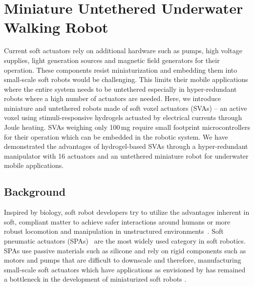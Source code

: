 \graphicspath{{Images/untetheredWalker/}}

\chapter{Miniature Untethered Underwater Walking Robot}
\label{chap:untetheredWalker}
Current soft actuators rely on additional hardware such as pumps, high voltage supplies, light generation sources and magnetic field generators for their operation. 
These components resist miniaturization and embedding them into small-scale soft robots would be challenging. This limits their mobile applications where the entire system needs to be untethered especially in hyper-redundant robots where a high number of actuators are needed. Here, we introduce miniature and untethered robots made of soft voxel actuators (SVAs) -- an active voxel using stimuli-responsive hydrogels actuated by electrical currents through Joule heating. SVAs weighing only 100\,mg require small footprint microcontrollers for their operation which can be embedded in the robotic system. We have demonstrated the advantages of hydrogel-based SVAs through a hyper-redundant manipulator with 16 actuators and an untethered miniature robot for underwater mobile applications.
\section{Background}
Inspired by biology, soft robot developers try to utilize the advantages inherent in soft, compliant matter to achieve safer interactions around humans or more robust locomotion and manipulation in unstructured environments~\cite{martinez2013,laschi2012,tolley2014b,AdamBilodeau2015}.  
Soft pneumatic actuators (SPAs)~\cite{Gorissen2017, Branyan2018} are the most widely used category in soft robotics. SPAs use passive materials such as silicone and rely on rigid components such as motors and pumps that are difficult to downscale and therefore, manufacturing small-scale soft actuators which have applications as envisioned by \cite{Hines2017} has remained a bottleneck in the development of miniaturized soft robots \cite{Majidi2019}. 

